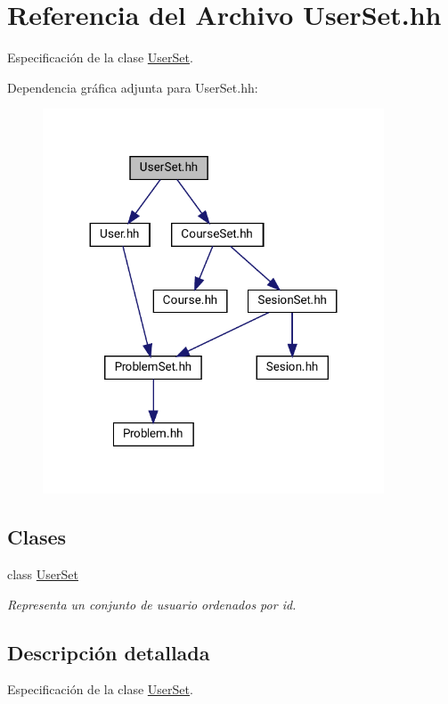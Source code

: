 \hypertarget{_user_set_8hh}{}\section{Referencia del Archivo User\+Set.\+hh}
\label{_user_set_8hh}


Especificación de la clase \mbox{\hyperlink{class_user_set}{User\+Set}}.  


Dependencia gráfica adjunta para User\+Set.\+hh\+:\nopagebreak
\begin{figure}[H]
\begin{center}
\leavevmode
\includegraphics[width=287pt]{_user_set_8hh__incl}
\end{center}
\end{figure}
\subsection*{Clases}
\begin{DoxyCompactItemize}
\item 
class \mbox{\hyperlink{class_user_set}{User\+Set}}
\begin{DoxyCompactList}\small\item\em Representa un conjunto de usuario ordenados por id. \end{DoxyCompactList}\end{DoxyCompactItemize}


\subsection{Descripción detallada}
Especificación de la clase \mbox{\hyperlink{class_user_set}{User\+Set}}. 

